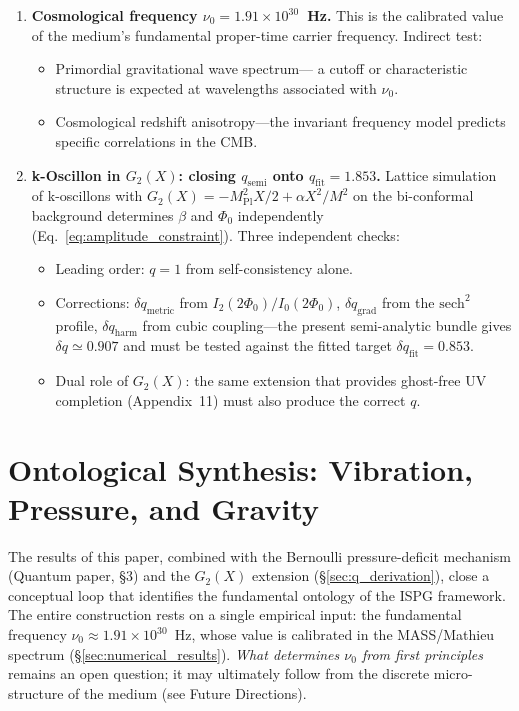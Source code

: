 \documentclass[11pt]{article}
\begin{document}
\begin{enumerate}
  \item \textbf{Cosmological frequency
    $\nu_0 = 1.91 \times 10^{30}$~Hz.}
    This is the calibrated value of the medium's fundamental
    proper-time carrier frequency.
    Indirect test:
    \begin{itemize}
      \item Primordial gravitational wave spectrum---
        a cutoff or characteristic structure is expected
        at wavelengths associated with $\nu_0$.
      \item Cosmological redshift anisotropy---the
        invariant frequency model predicts specific
        correlations in the CMB.
    \end{itemize}

  \item \textbf{k-Oscillon in $G_2(X)$:
    closing $q_{\mathrm{semi}}$ onto
    $q_{\mathrm{fit}} = 1.853$.}
    Lattice simulation of k-oscillons with
    $G_2(X) = -M_{\mathrm{Pl}}^2 X/2
    + \alpha X^2/M^2$ on the bi-conformal background
    determines $\beta$ and $\Phi_0$ independently
    (Eq.~\ref{eq:amplitude_constraint}).
    Three independent checks:
    \begin{itemize}
      \item Leading order: $q = 1$ from
        self-consistency alone.
      \item Corrections:
        $\delta q_{\mathrm{metric}}$ from
        $I_2(2\Phi_0)/I_0(2\Phi_0)$,
        $\delta q_{\mathrm{grad}}$ from the
        $\mathrm{sech}^2$ profile,
        $\delta q_{\mathrm{harm}}$ from cubic
        coupling---the present semi-analytic bundle gives
        $\delta q\simeq 0.907$ and must be tested against
        the fitted target $\delta q_{\mathrm{fit}}=0.853$.
      \item Dual role of $G_2(X)$: the same
        extension that provides ghost-free UV
        completion (Appendix~11) must also produce
        the correct $q$.
    \end{itemize}
\end{enumerate}

\section{Ontological Synthesis: Vibration, Pressure, and Gravity}
\label{sec:ontology}

The results of this paper, combined with the Bernoulli
pressure-deficit mechanism (Quantum paper, \S3) and the
$G_2(X)$ extension (\S\ref{sec:q_derivation}), close a
conceptual loop that identifies the fundamental ontology
of the ISPG framework. The entire construction rests on
a single empirical input: the fundamental frequency
$\nu_0 \approx 1.91 \times 10^{30}$~Hz, whose value is
calibrated in the MASS/Mathieu spectrum
(\S\ref{sec:numerical_results}).
\emph{What determines $\nu_0$ from first principles}
remains an open question; it may ultimately follow from
the discrete micro-structure of the medium (see Future
Directions).
\end{document}
